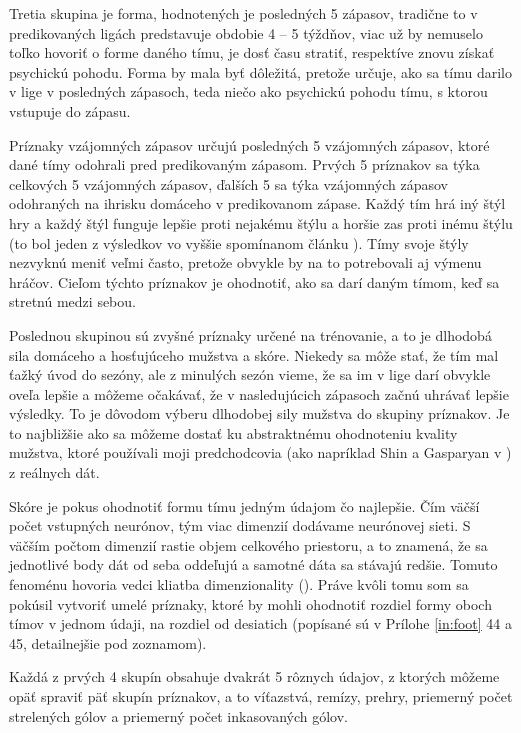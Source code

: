 Tretia skupina je forma, hodnotených je posledných 5 zápasov, tradične to v predikovaných ligách predstavuje obdobie 4 -- 5 týždňov, viac už by nemuselo toľko hovoriť o forme daného tímu, je dosť času stratiť, respektíve znovu získať psychickú pohodu. Forma by mala byť dôležitá, pretože určuje, ako sa tímu darilo v lige v posledných zápasoch, teda niečo ako psychickú pohodu tímu, s ktorou vstupuje do zápasu.

Príznaky vzájomných zápasov určujú posledných 5 vzájomných zápasov, ktoré dané tímy odohrali pred predikovaným zápasom. Prvých 5 príznakov sa týka celkových 5 vzájomných zápasov, ďalších 5 sa týka vzájomných zápasov odohraných na ihrisku domáceho v predikovanom zápase. Každý tím hrá iný štýl hry a každý štýl funguje lepšie proti nejakému štýlu a horšie zas proti inému štýlu (to bol jeden z výsledkov vo vyššie spomínanom článku \citep{related:shin}). Tímy svoje štýly nezvyknú meniť veľmi často, pretože obvykle by na to potrebovali aj výmenu hráčov. Cieľom týchto príznakov je ohodnotiť, ako sa darí daným tímom, keď sa stretnú medzi sebou.

Poslednou skupinou sú zvyšné príznaky určené na trénovanie, a to je dlhodobá sila domáceho a hosťujúceho mužstva a skóre. 
Niekedy sa môže stať, že tím mal ťažký úvod do sezóny, ale z minulých sezón vieme, že sa im v lige darí obvykle oveľa lepšie a môžeme očakávať, že v nasledujúcich zápasoch začnú uhrávať lepšie výsledky. 
To je dôvodom výberu dlhodobej sily mužstva do skupiny príznakov.
Je to najbližšie ako sa môžeme dostať ku abstraktnému ohodnoteniu kvality mužstva, ktoré používali moji predchodcovia (ako napríklad Shin a Gasparyan v \citep{related:shin}) z reálnych dát.

Skóre je pokus ohodnotiť formu tímu jedným údajom čo najlepšie.
Čím väčší počet vstupných neurónov, tým viac dimenzií dodávame neurónovej sieti.
S väčším počtom dimenzií rastie objem celkového priestoru, a to znamená, že sa jednotlivé body dát od seba oddeľujú a samotné dáta sa stávajú redšie.
Tomuto fenoménu hovoria vedci kliatba dimenzionality (\citep{curse}).
Práve kvôli tomu som sa pokúsil vytvoriť umelé príznaky, ktoré by mohli ohodnotiť rozdiel formy oboch tímov v jednom údaji, na rozdiel od desiatich (popísané sú v Prílohe \ref{in:foot} 44 a 45, detailnejšie pod zoznamom).

Každá z prvých 4 skupín obsahuje dvakrát 5 rôznych údajov, z ktorých môžeme opäť spraviť päť skupín príznakov, a to víťazstvá, remízy, prehry, priemerný počet strelených gólov a priemerný počet inkasovaných gólov.

